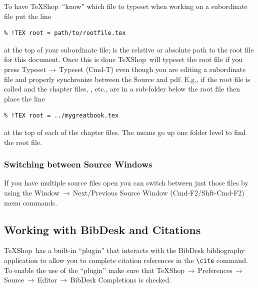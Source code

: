 \documentclass[letterpaper,11pt]{article}
\newcommand{\TS}{\textsf{\TeX Shop}}
\newcommand{\acr}[1]{\textsf{#1}}
\newcommand{\cmd}[1]{\textsf{#1}}
\newcommand{\mnu}[1]{\textsf{#1}}
\newcommand{\To}{\,\(\to\)\,}
\begin{document}
To have \TS\ ``know'' which file to typeset when working on a subordinate file put the line
\begin{verbatim}
% !TEX root = path/to/rootfile.tex
\end{verbatim}
at the top of your subordinate file;  is the relative or absolute path to the root file for this document. Once this is done \TS\ will typeset the root file if you press \mnu{Typeset}\To\mnu{Typeset} (\cmd{Cmd-T}) even though you are editing a subordinate file and properly synchronize between the Source and \acr{pdf}. E.g., if the root file is called  and the chapter files, , etc., are in a  sub-folder below the root file then place the line
\begin{verbatim}
% !TEX root = ../mygreatbook.tex
\end{verbatim}
at the top of each of the chapter files. The  means go up one folder level to find the root file.

\subsubsection{Switching between Source Windows}

If you have multiple source files open you can switch between just those files by using the \mnu{Window}\To\mnu{Next/Previous Source Window} (\cmd{Cmd-F2}/\cmd{Shft-Cmd-F2}) menu commands.

\subsection{Working with \cmd{BibDesk} and Citations}

\TS\ has a built-in ``plugin'' that interacts with the \cmd{BibDesk} bibliography application to allow you to complete citation references in the \verb|\cite| command.  To enable the use of the ``plugin'' make sure that \mnu{TeXShop}\To\mnu{Preferences}\To\mnu{Source}\To\mnu{Editor}\To\mnu{BibDesk Completions} is checked. 
\end{document}
